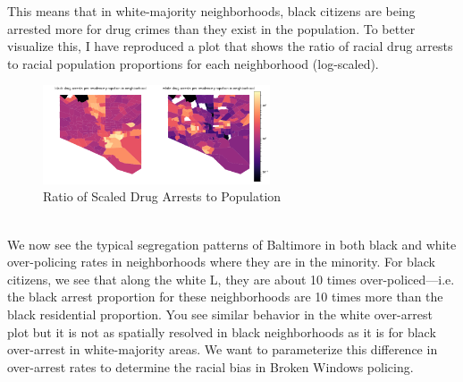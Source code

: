 \documentclass[10pt]{article}
\begin{document}
This means that in white-majority neighborhoods, black citizens are being arrested more for drug crimes than they exist in the population. To better visualize this, I have reproduced a plot that shows the ratio of racial drug arrests to racial population proportions for each neighborhood (log-scaled). 
    \begin{figure}[!htb]
    \begin{minipage}{\textwidth}
     \caption{Ratio of Scaled Drug Arrests to Population}
     \centering
     \includegraphics[width=0.6\textwidth]{imgs/logdrugpop.png}
   \end{minipage}\hfill
 \end{figure}\\
 We now see the typical segregation patterns of Baltimore in both black and white over-policing rates in neighborhoods where they are in the minority. For black citizens, we see that along the white L, they are about 10 times over-policed---i.e. the black arrest proportion for these neighborhoods are 10 times more than the black residential proportion. You see similar behavior in the white over-arrest plot but it is not as spatially resolved in black neighborhoods as it is for black over-arrest in white-majority areas. We want to parameterize this difference in over-arrest rates to determine the racial bias in Broken Windows policing.
 
\end{document}
